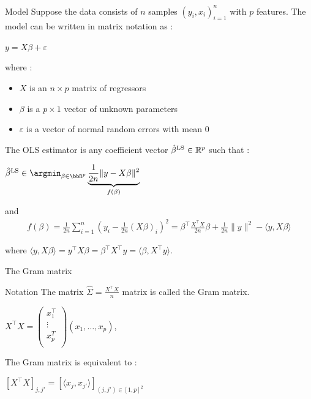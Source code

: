 \documentclass[unknownkeysallowed]{beamer}
\begin{document}
\begin{frame}{Model}
Suppose the data consists of $n$ samples $( y_i, x_i )^n_{i=1}$ with $p$ features.
\newline The model can be written in matrix notation as :
\begin{center}
$y=X\beta+\varepsilon$
\end{center}
where :
 \begin{itemize}
        \item $X$ is an $n \times p$ matrix of regressors
	    \item $\beta$ is a $p \times 1$ vector of unknown parameters
	    \item $\varepsilon$ is a vector of normal random errors with mean $0$
\end{itemize}
\end{frame}
\begin{frame}
The OLS estimator is any coefficient vector
$\hat\beta^{\rm LS}\in\mathbb{R}^p$ such that :
\newline
\begin{center}
$\hat\beta^{\rm LS} \in \argmin_{\beta \in \bbR^p}
\underbrace{\frac{1}{2n}\|y-X\beta\|^2 }_{f(\beta)}$
\end{center}

and
\begin{align*}
	f(\beta)
	= \frac{1}{2n}\sum_{i=1}^n (y_{i}-\frac{1}{2n}(X\beta)_{i})^2
	= \beta^{\top}\frac{X^{\top}X}{2n}\beta+\frac{1}{2n}\|y\|^2- \langle y,X\beta\rangle
\end{align*}

\vspace{0.5cm}
where
$\langle y,X\beta\rangle=y^{\top}X\beta=\beta^{\top}X^{\top}y=\langle \beta,X^{\top}y\rangle$.
\end{frame}

\begin{frame}{The Gram matrix}


\begin{block}{Notation}
The matrix $\hat\Sigma=\frac{X^{\top}X}{n}$ matrix is called the Gram matrix.
\begin{center}
   $X^{\top}X=\begin{pmatrix}
   x_{1}^{\top}  \\
   \vdots   \\
   x_{p}^T  \\
\end{pmatrix}(x_{1},\dots, x_{p}) $,
\end{center}
\end{block}

The Gram matrix is equivalent to :

\begin{center}
$[X^{\top}X]_{j,j'}=[\langle x_{j},x_{j'}\rangle]_{(j,j')\in[1,p]^2}$ 
\end{center}


\end{frame}
\end{document}
